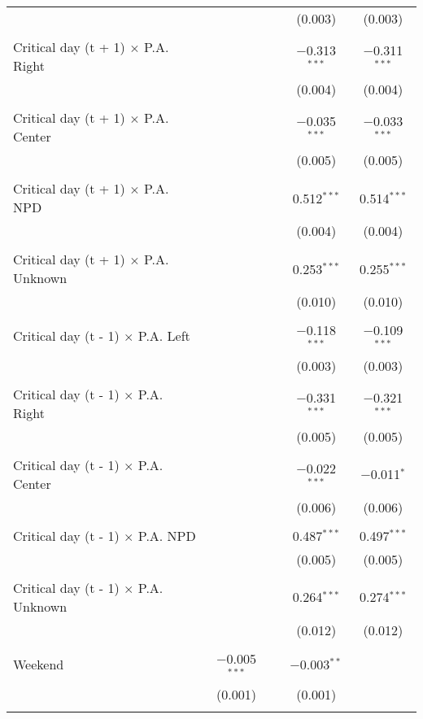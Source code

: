 \documentclass[
]{article}
\begin{document}
\begin{table}[!htbp]
{\begin{tabular}{@{\extracolsep{5pt}}lcccc}
  &  &  & (0.003) & (0.003) \\ 
  & & & & \\ 
 Critical day (t + 1) $\times$ P.A. Right &  &  & $-$0.313$^{***}$ & $-$0.311$^{***}$ \\ 
  &  &  & (0.004) & (0.004) \\ 
  & & & & \\ 
 Critical day (t + 1) $\times$ P.A. Center &  &  & $-$0.035$^{***}$ & $-$0.033$^{***}$ \\ 
  &  &  & (0.005) & (0.005) \\ 
  & & & & \\ 
 Critical day (t + 1) $\times$ P.A. NPD &  &  & 0.512$^{***}$ & 0.514$^{***}$ \\ 
  &  &  & (0.004) & (0.004) \\ 
  & & & & \\ 
 Critical day (t + 1) $\times$ P.A. Unknown &  &  & 0.253$^{***}$ & 0.255$^{***}$ \\ 
  &  &  & (0.010) & (0.010) \\ 
  & & & & \\ 
 Critical day (t - 1) $\times$ P.A. Left &  &  & $-$0.118$^{***}$ & $-$0.109$^{***}$ \\ 
  &  &  & (0.003) & (0.003) \\ 
  & & & & \\ 
 Critical day (t - 1) $\times$ P.A. Right &  &  & $-$0.331$^{***}$ & $-$0.321$^{***}$ \\ 
  &  &  & (0.005) & (0.005) \\ 
  & & & & \\ 
 Critical day (t - 1) $\times$ P.A. Center &  &  & $-$0.022$^{***}$ & $-$0.011$^{*}$ \\ 
  &  &  & (0.006) & (0.006) \\ 
  & & & & \\ 
 Critical day (t - 1) $\times$ P.A. NPD &  &  & 0.487$^{***}$ & 0.497$^{***}$ \\ 
  &  &  & (0.005) & (0.005) \\ 
  & & & & \\ 
 Critical day (t - 1) $\times$ P.A. Unknown &  &  & 0.264$^{***}$ & 0.274$^{***}$ \\ 
  &  &  & (0.012) & (0.012) \\ 
  & & & & \\ 
 Weekend & $-$0.005$^{***}$ &  & $-$0.003$^{**}$ &  \\ 
  & (0.001) &  & (0.001) &  \\ 
  & & & & \\ 

\end{tabular}}
\end{table}
\end{document}
